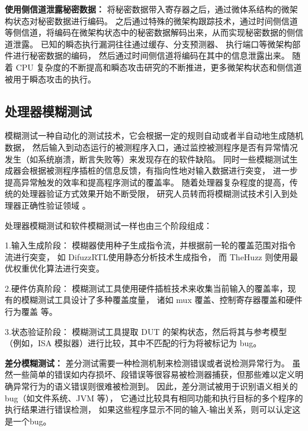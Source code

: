 \textbf{使用侧信道泄露秘密数据：}
将秘密数据带入寄存器之后，通过微体系结构的微架构状态对秘密数据进行编码。
之后通过特殊的微架构跟踪技术，通过时间侧信道等侧信道，将编码在微架构状态中的秘密数据解码出来，从而实现秘密数据的侧信道泄露。
已知的瞬态执行漏洞往往通过缓存\cite{yarom2014flush+}、分支预测器\cite{evtyushkin2018branchscope}、
执行端口\cite{bhattacharyya2019smotherspectre}等微架构部件进行秘密数据的编码，
然后通过时间侧信道将编码在其中的信息泄露出来。
随着 CPU 复杂度的不断提高和瞬态攻击研究的不断推进，更多微架构状态和侧信道被用于瞬态攻击的执行。\par

\subsection{处理器模糊测试}

模糊测试一种自动化的测试技术，它会根据一定的规则自动或者半自动地生成随机数据，
然后输入到动态运行的被测程序入口，通过监控被测程序是否有异常情况发生（如系统崩溃，断言失败等）来发现存在的软件缺陷。
同时一些模糊测试生成器会根据被测程序插桩的信息反馈，有指向性地对输入数据进行突变，
进一步提高异常触发的效率和提高程序测试的覆盖率。
随着处理器复杂程度的提高，传统的处理器验证方式效果开始不断受限，
研究人员转而将模糊测试技术引入到处理器正确性验证领域 
\cite{bruns2022efficient}\cite{canakci2021directfuzz}\cite{hur2021difuzzrtl}。\par

处理器模糊测试和软件模糊测试一样也由三个阶段组成：\par

1.输入生成阶段：
模糊器使用种子生成指令流，并根据前一轮的覆盖范围对指令流进行突变，
如 DifuzzRTL\cite{hur2021difuzzrtl}使用静态分析技术生成指令，
而 TheHuzz\cite{kande2022thehuzz} 则使用最优权重优化算法进行突变。\par

2.硬件仿真阶段：
模糊测试工具使用硬件插桩技术来收集当前输入的覆盖率，现有的模糊测试工具设计了多种覆盖度量，
诸如 mux 覆盖\cite{laeufer2018rfuzz}、控制寄存器覆盖\cite{hur2021difuzzrtl}和硬件行为覆盖\cite{kande2022thehuzz} 等。\par

3.状态验证阶段：
模糊测试工具提取 DUT 的架构状态，然后将其与参考模型（例如，ISA 模拟器）进行比较，其中不匹配的行为将被标记为 bug。\par

\par

\textbf{差分模糊测试：}
差分测试需要一种检测机制来检测错误或者说检测异常行为。
虽然一些简单的错误如内存损坏、段错误等很容易被检测器捕获，但那些难以定义明确异常行为的语义错误则很难被检测到。
因此，差分测试被用于识别语义相关的 bug（如文件系统\cite{min2015cross}、JVM\cite{chen2019deep} 等），
它通过比较具有相同功能和执行目标的多个程序的执行结果进行错误检测，
如果这些程序显示不同的输入-输出关系，则可以认定这是一个bug。\par


